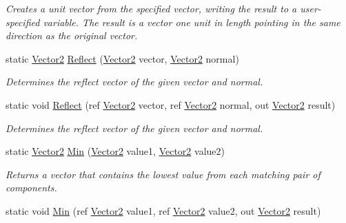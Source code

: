 \begin{DoxyCompactItemize}
\begin{DoxyCompactList}\small\item\em Creates a unit vector from the specified vector, writing the result to a user-\/specified variable. The result is a vector one unit in length pointing in the same direction as the original vector.\end{DoxyCompactList}\item 
static \hyperlink{struct_microsoft_1_1_xna_1_1_framework_1_1_vector2}{Vector2} \hyperlink{struct_microsoft_1_1_xna_1_1_framework_1_1_vector2_a3016b350393f1b600317d8938b0f1389}{Reflect} (\hyperlink{struct_microsoft_1_1_xna_1_1_framework_1_1_vector2}{Vector2} vector, \hyperlink{struct_microsoft_1_1_xna_1_1_framework_1_1_vector2}{Vector2} normal)
\begin{DoxyCompactList}\small\item\em Determines the reflect vector of the given vector and normal.\end{DoxyCompactList}\item 
static void \hyperlink{struct_microsoft_1_1_xna_1_1_framework_1_1_vector2_ac6866823e16484efb29d38b6584f160f}{Reflect} (ref \hyperlink{struct_microsoft_1_1_xna_1_1_framework_1_1_vector2}{Vector2} vector, ref \hyperlink{struct_microsoft_1_1_xna_1_1_framework_1_1_vector2}{Vector2} normal, out \hyperlink{struct_microsoft_1_1_xna_1_1_framework_1_1_vector2}{Vector2} result)
\begin{DoxyCompactList}\small\item\em Determines the reflect vector of the given vector and normal.\end{DoxyCompactList}\item 
static \hyperlink{struct_microsoft_1_1_xna_1_1_framework_1_1_vector2}{Vector2} \hyperlink{struct_microsoft_1_1_xna_1_1_framework_1_1_vector2_a3ff30d3384ff9de35b0d2f95bfc9c822}{Min} (\hyperlink{struct_microsoft_1_1_xna_1_1_framework_1_1_vector2}{Vector2} value1, \hyperlink{struct_microsoft_1_1_xna_1_1_framework_1_1_vector2}{Vector2} value2)
\begin{DoxyCompactList}\small\item\em Returns a vector that contains the lowest value from each matching pair of components.\end{DoxyCompactList}\item 
static void \hyperlink{struct_microsoft_1_1_xna_1_1_framework_1_1_vector2_ab4f299942d39bc3b4eea31220dcafd28}{Min} (ref \hyperlink{struct_microsoft_1_1_xna_1_1_framework_1_1_vector2}{Vector2} value1, ref \hyperlink{struct_microsoft_1_1_xna_1_1_framework_1_1_vector2}{Vector2} value2, out \hyperlink{struct_microsoft_1_1_xna_1_1_framework_1_1_vector2}{Vector2} result)

\end{DoxyCompactItemize}
